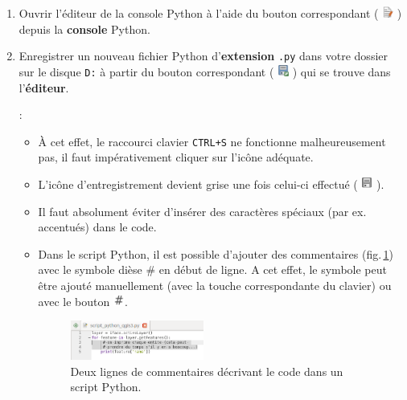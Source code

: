\documentclass[11pt]{article}
\begin{document}
\begin{enumerate}
\item Ouvrir l'éditeur de la console Python à l'aide du bouton correspondant ( \includegraphics[width=1em]{iconShowEditorConsole.png} ) depuis la \textbf{console} Python.






\item Enregistrer un nouveau fichier Python d'\textbf{extension} \texttt{.py} dans votre dossier sur le disque \texttt{D:} à partir du bouton correspondant ( \includegraphics[width=1em]{mActionFileSaveAs.png} ) qui se trouve dans l'\textbf{éditeur}. 

\underline{}:
\begin{itemize}\itemsep0.2em
\renewcommand\labelitemi{\--}
\item À cet effet, le raccourci clavier \og{}\texttt{CTRL+S}\fg{} ne fonctionne malheureusement pas, il faut impérativement cliquer sur l'icône adéquate.
\item %
L'icône d'entregistrement devient grise une fois celui-ci effectué ( \includegraphics[width=1em]{mActionFileSave_gray.png} ).
\item Il faut absolument éviter d'insérer des caractères spéciaux (par ex. accentués) dans le code.
\item Dans le script Python, il est possible d'ajouter des commentaires (fig.\,\ref{comment}) avec le symbole dièse \og{}\#\fg{} en début de ligne. A cet effet, le symbole peut être ajouté manuellement (avec la touche correspondante du clavier) ou avec le bouton \includegraphics[width=1em]{iconCommentEditorConsole.png}.
\vspace*{-0.4em}
\begin{figure}[H]
\centering
\includegraphics[width=0.44\textwidth]{comment.png}
\vspace*{-0.64em}
\caption{Deux lignes de commentaires décrivant le code dans un script Python.}
\label{comment}
\end{figure}
\vspace*{-1em}


\end{itemize}
\end{enumerate}
\end{document}
